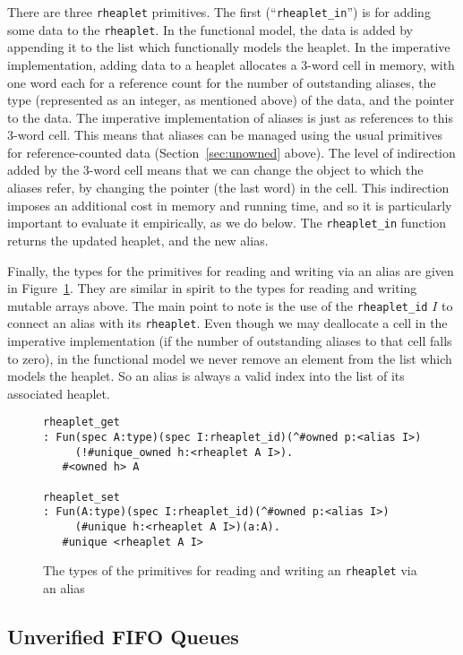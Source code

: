 \documentclass[9pt,natbib]{sigplanconf}
\begin{document}
There are three \texttt{rheaplet} primitives.  The first
(``\texttt{rheaplet\_in}'') is for adding some data to the
\texttt{rheaplet}.  In the functional model, the data is added by
appending it to the list which functionally models the heaplet.  In
the imperative implementation, adding data to a heaplet allocates a
3-word cell in memory, with one word each for a reference count for
the number of outstanding aliases, the type (represented as an
integer, as mentioned above) of the data, and the pointer to the data.
The imperative implementation of aliases is just as references to this
3-word cell.  This means that aliases can be managed using the usual
primitives for reference-counted data (Section~\ref{sec:unowned}
above).  The level of indirection added by the 3-word cell means that
we can change the object to which the aliases refer, by changing the
pointer (the last word) in the cell.  This indirection imposes an
additional cost in memory and running time, and so it is particularly
important to evaluate it empirically, as we do below.  The
\texttt{rheaplet\_in} function returns the updated heaplet, and the
new alias.

Finally, the types for the primitives for reading and writing via an
alias are given in Figure~\ref{fig:rheaplet}.  They are similar in
spirit to the types for reading and writing mutable arrays above.  The
main point to note is the use of the \texttt{rheaplet\_id} $I$ to
connect an alias with its \texttt{rheaplet}.  Even though we may
deallocate a cell in the imperative implementation (if the number of
outstanding aliases to that cell falls to zero), in the functional
model we never remove an element from the list which models the
heaplet.  So an alias is always a valid index into the list of its
associated heaplet.

\begin{figure}
\small
\begin{verbatim}
rheaplet_get
: Fun(spec A:type)(spec I:rheaplet_id)(^#owned p:<alias I>)
     (!#unique_owned h:<rheaplet A I>).
   #<owned h> A

rheaplet_set
: Fun(A:type)(spec I:rheaplet_id)(^#owned p:<alias I>)
     (#unique h:<rheaplet A I>)(a:A).
   #unique <rheaplet A I>
\end{verbatim}
\caption{The types of the primitives for reading and writing an \texttt{rheaplet} via an alias}
\label{fig:rheaplet}
\end{figure}

\subsection{Unverified FIFO Queues}
\end{document}
